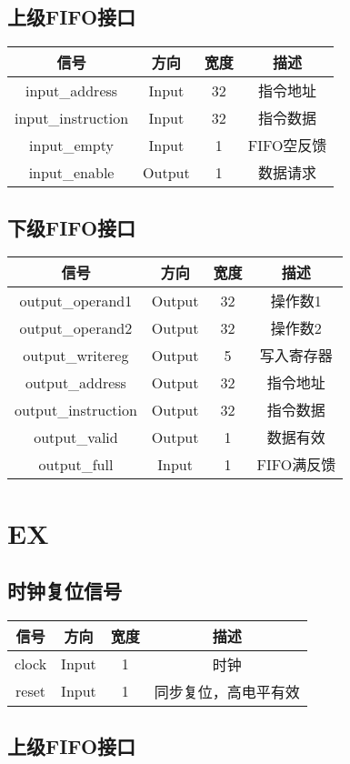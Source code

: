 \documentclass{article}
\newenvironment{signals}{
	\begin{center}
		\begin{tabular}{| c | c | c | c |}
			\hline
			信号 & 方向 & 宽度 & 描述 \\ \hline
}{
		\end{tabular}
	\end{center}
}
\newcommand\sigin{Input}
\newcommand\sigout{Output}
\begin{document}
\subsection{上级FIFO接口}

\begin{signals}
	input\_address & \sigin & 32 & 指令地址 \\ \hline
	input\_instruction & \sigin & 32 & 指令数据 \\ \hline
	input\_empty & \sigin & 1 & FIFO空反馈 \\ \hline
	input\_enable & \sigout & 1 & 数据请求 \\ \hline
\end{signals}

\subsection{下级FIFO接口}

\begin{signals}
	output\_operand1 & \sigout & 32 & 操作数1 \\ \hline
	output\_operand2 & \sigout & 32 & 操作数2 \\ \hline
	output\_writereg & \sigout & 5 & 写入寄存器 \\ \hline
	output\_address & \sigout & 32 & 指令地址 \\ \hline
	output\_instruction & \sigout & 32 & 指令数据 \\ \hline
	output\_valid & \sigout & 1 & 数据有效 \\ \hline
	output\_full & \sigin & 1 & FIFO满反馈 \\ \hline
\end{signals}

\section{EX}

\subsection{时钟复位信号}

\begin{signals}
	clock & \sigin & 1 & 时钟 \\ \hline
	reset & \sigin & 1 & 同步复位，高电平有效 \\ \hline
\end{signals}

\subsection{上级FIFO接口}
\end{document}
